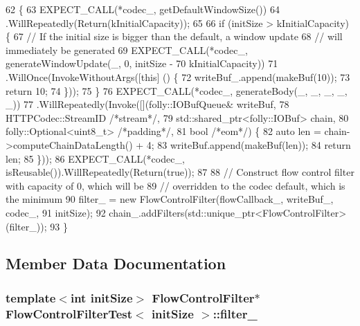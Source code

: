 \begin{DoxyCode}
62                         \{
63     EXPECT\_CALL(*codec_, getDefaultWindowSize())
64       .WillRepeatedly(Return(kInitialCapacity));
65 
66     \textcolor{keywordflow}{if} (initSize > kInitialCapacity) \{
67       \textcolor{comment}{// If the initial size is bigger than the default, a window update}
68       \textcolor{comment}{// will immediately be generated}
69       EXPECT\_CALL(*codec_, generateWindowUpdate(\_, 0, initSize -
70                                                 kInitialCapacity))
71         .WillOnce(InvokeWithoutArgs([\textcolor{keyword}{this}] () \{
72               writeBuf_.append(makeBuf(10));
73               \textcolor{keywordflow}{return} 10;
74             \}));
75     \}
76     EXPECT\_CALL(*codec_, generateBody(\_, \_, \_, \_, \_))
77         .WillRepeatedly(Invoke([](folly::IOBufQueue& writeBuf,
78                                   HTTPCodec::StreamID \textcolor{comment}{/*stream*/},
79                                   std::shared\_ptr<folly::IOBuf> chain,
80                                   folly::Optional<uint8\_t> \textcolor{comment}{/*padding*/},
81                                   \textcolor{keywordtype}{bool} \textcolor{comment}{/*eom*/}) \{
82           \textcolor{keyword}{auto} len = chain->computeChainDataLength() + 4;
83           writeBuf.append(makeBuf(len));
84           \textcolor{keywordflow}{return} len;
85         \}));
86     EXPECT\_CALL(*codec_, isReusable()).WillRepeatedly(Return(\textcolor{keyword}{true}));
87 
88     \textcolor{comment}{// Construct flow control filter with capacity of 0, which will be}
89     \textcolor{comment}{// overridden to the codec default, which is the minimum}
90     filter_ = \textcolor{keyword}{new} FlowControlFilter(flowCallback_, writeBuf_, codec_,
91                                     initSize);
92     chain_.addFilters(std::unique\_ptr<FlowControlFilter>(filter_));
93   \}
\end{DoxyCode}


\subsection{Member Data Documentation}
\subsubsection[{filter\+\_\+}]{\setlength{\rightskip}{0pt plus 5cm}template$<$int init\+Size$>$ {\bf Flow\+Control\+Filter}$\ast$ {\bf Flow\+Control\+Filter\+Test}$<$ init\+Size $>$\+::filter\+\_\+}\label{classFlowControlFilterTest_a42b971d7053e6fb7b0c64ec8b00ff64a}


